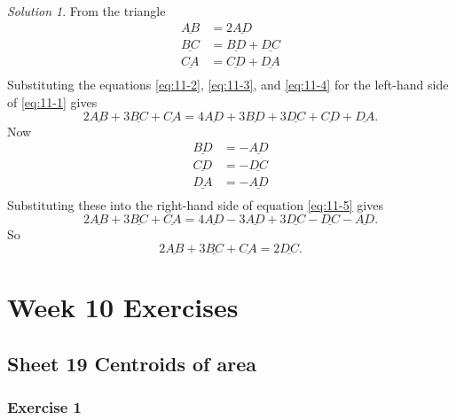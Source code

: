 \documentclass[
  english,
  11pt,
  oneside]{book}
\newcommand{\slide}{}
\theoremstyle{definition}
\theoremstyle{definition}
\theoremstyle{definition}
\theoremstyle{definition}
\theoremstyle{remark}
\newtheorem*{solution}{Solution}
\begin{document}
\begin{solution}
From the triangle
\begin{align}
\underline{AB}&=2\underline{AD}
\label{eq:11-2}\\
\underline{BC}&=\underline{BD}+\underline{DC}
\label{eq:11-3}\\
\underline{CA}&=\underline{CD}+\underline{DA}
\label{eq:11-4}\\
\end{align}
Substituting the equations \eqref{eq:11-2}, \eqref{eq:11-3}, and \eqref{eq:11-4} for the left-hand side of \eqref{eq:11-1} gives
\begin{equation}
2\underline{AB}+3\underline{BC}+\underline{CA}=4\underline{AD}+3\underline{BD}+3\underline{DC}+\underline{CD}+\underline{DA}.
\label{eq:11-5}
\end{equation}
Now
\begin{align*}
\underline{BD}&=-\underline{AD}\\
\underline{CD}&=-\underline{DC}\\
\underline{DA}&=-\underline{AD}\\
\end{align*}
Substituting these into the right-hand side of equation \eqref{eq:11-5} gives
\[2\underline{AB}+3\underline{BC}+\underline{CA}=4\underline{AD}-3\underline{AD}+3\underline{DC}-\underline{DC}-\underline{AD}.\]
So
\[2\underline{AB}+3\underline{BC}+\underline{CA} = 2\underline{DC}.\]
\end{solution}

\slide

\begin{slidesonly}

\hbox{}
\slide

\end{slidesonly}

\chapter*{Week 10 Exercises}\label{week-10-exercises}

\section{Sheet 19 Centroids of area}\label{sheet-19-centroids-of-area}

\slide

\subsection*{Exercise 1}\label{exercise-1-11}
\end{document}
